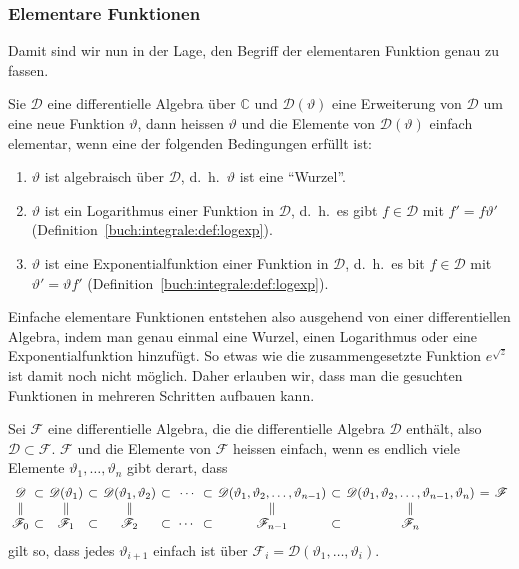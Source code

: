 \subsubsection{Elementare Funktionen}
Damit sind wir nun in der Lage, den Begriff der elementaren Funktion
genau zu fassen.

\begin{definition}
\label{buch:integrale:def:einfache-elementare-funktion}
Sie $\mathscr{D}$ eine differentielle Algebra über $\mathbb{C}$ und
$\mathscr{D}(\vartheta)$ eine Erweiterung von $\mathscr{D}$ um eine
neue Funktion $\vartheta$, dann heissen $\vartheta$ und die Elemente
von $\mathscr{D}(\vartheta)$ einfach elementar, wenn eine der folgenden
Bedingungen erfüllt ist:
\begin{enumerate}
\item $\vartheta$ ist algebraisch über $\mathscr{D}$, d.~h.~$\vartheta$
ist eine ``Wurzel''.
\item $\vartheta$ ist ein Logarithmus einer Funktion in $\mathscr{D}$,
d.~h.~es gibt $f\in \mathscr{D}$ mit $f'=f\vartheta'$
(Definition~\ref{buch:integrale:def:logexp}).
\item $\vartheta$ ist eine Exponentialfunktion einer Funktion in $\mathscr{D}$,
d.~h.~es bit $f\in\mathscr{D}$ mit $\vartheta'=\vartheta f'$
(Definition~\ref{buch:integrale:def:logexp}).
\end{enumerate}
\end{definition}

Einfache elementare Funktionen entstehen also ausgehend von einer 
differentiellen Algebra, indem man genau einmal eine Wurzel, einen
Logarithmus oder eine Exponentialfunktion hinzufügt.
So etwas wie die zusammengesetzte Funktion $e^{\sqrt{z}}$ ist
damit noch nicht möglich.
Daher erlauben wir, dass man die gesuchten Funktionen in mehreren
Schritten aufbauen kann.

\begin{definition}
Sei $\mathscr{F}$ eine differentielle Algebra, die die differentielle
Algebra $\mathscr{D}$ enthält, also $\mathscr{D}\subset\mathscr{F}$.
$\mathscr{F}$ und die Elemente von $\mathscr{F}$ heissen einfach,
wenn es endlich viele Elemente $\vartheta_1,\dots,\vartheta_n$ gibt
derart, dass
\[
\renewcommand{\arraycolsep}{2pt}
\begin{array}{ccccccccccccc}
\mathscr{D}
&\subset&
\mathscr{D}(\vartheta_1)
&\subset&
\mathscr{D}(\vartheta_1,\vartheta_2)
&\subset&
\;
\cdots
\;
&\subset&
\mathscr{D}(\vartheta_1,\vartheta_2,\dots,\vartheta_{n-1})
&\subset&
\mathscr{D}(\vartheta_1,\vartheta_2,\dots,\vartheta_{n-1},\vartheta_n)
&=&
\mathscr{F}
\\
\|
&&
\|
&&
\|
&&
&&
\|
&&
\|
&&
\\
\mathscr{F}_0
&\subset&
\mathscr{F}_1
&\subset&
\mathscr{F}_2
&\subset&
\cdots
&\subset&
\mathscr{F}_{n-1}
&\subset&
\mathscr{F}_{n\mathstrut}
&&
\end{array}
\]
gilt so, dass jedes $\vartheta_{i+1}$ einfach ist über 
$\mathscr{F}_i=\mathscr{D}(\vartheta_1,\dots,\vartheta_i)$.
\end{definition}

